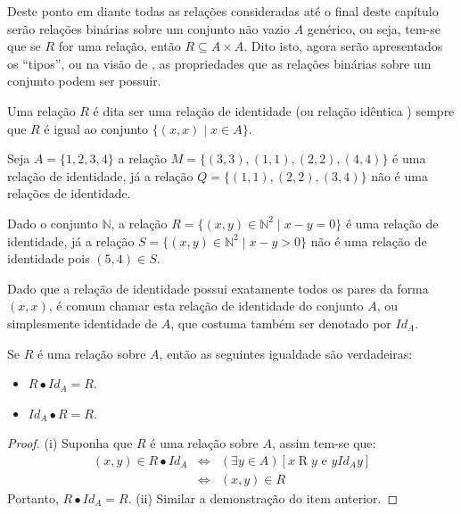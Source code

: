 Deste ponto em diante todas as relações consideradas até o final deste capítulo serão relações binárias sobre um conjunto não vazio $A$ genérico, ou seja, tem-se que se $R$ for uma relação, então $R \subseteq A \times A$. Dito isto, agora serão apresentados os ``tipos'', ou na visão de \cite{abe1991-TC}, as propriedades que as relações binárias sobre um conjunto podem ser possuir.

\begin{definicao}\label{def:RelacaoIdentica}
	Uma relação $R$ é dita ser uma relação de identidade (ou relação idêntica \cite{abe1991-TC}) sempre que $R$ é igual ao conjunto $\{(x, x) \mid x \in A\}$.
\end{definicao}

\begin{exemplo}
	Seja $A = \{1, 2, 3, 4\}$ a relação $M = \{(3, 3), (1, 1), (2,2), (4,4)\}$ é uma relação de identidade, já a relação $Q = \{(1, 1), (2,2), (3,4)\}$ não é uma relações de identidade.
\end{exemplo}

\begin{exemplo}
	Dado o conjunto $\mathbb{N}$, a relação $R = \{(x, y) \in \mathbb{N}^2 \mid x - y = 0\}$ é uma relação de identidade, já a relação $S =  \{(x, y) \in \mathbb{N}^2 \mid x - y > 0\}$ não é uma relação de identidade pois $(5, 4) \in S$.
\end{exemplo}

\begin{nota}
  Dado que a relação de identidade possui exatamente todos os pares da forma $(x, x)$, é comum chamar esta relação de identidade do conjunto $A$, ou simplesmente identidade de $A$, que costuma também ser denotado por $Id_A$.
\end{nota}

\begin{teorema}\label{teo:NeutralidadeRelacaoIdentidade}
	Se $R$ é uma relação sobre $A$, então as seguintes igualdade são verdadeiras:
	\begin{itemize}
		\item[(i)] $R \bullet Id_A = R$.
		\item[(ii)] $Id_A \bullet R = R$.
	\end{itemize}
\end{teorema}

\begin{proof}
	(i) Suponha que $R$ é uma relação sobre $A$, assim tem-se que:
	\begin{eqnarray*}
		(x, y) \in R \bullet Id_A  & \Longleftrightarrow & (\exists y \in A)[x \mathrel{R} y \text{ e } y \mathrel{Id_A} y]\\
		& \Longleftrightarrow & (x, y) \in R 
	\end{eqnarray*}
	Portanto,  $R \bullet Id_A = R$. (ii) Similar a demonstração do item anterior.
\end{proof}

